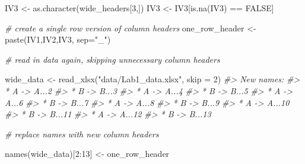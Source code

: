 \documentclass[
]{book}
\newenvironment{Shaded}{\begin{snugshade}}{\end{snugshade}}
\newcommand{\AttributeTok}[1]{\textcolor[rgb]{0.77,0.63,0.00}{#1}}
\newcommand{\CommentTok}[1]{\textcolor[rgb]{0.56,0.35,0.01}{\textit{#1}}}
\newcommand{\ConstantTok}[1]{\textcolor[rgb]{0.00,0.00,0.00}{#1}}
\newcommand{\DecValTok}[1]{\textcolor[rgb]{0.00,0.00,0.81}{#1}}
\newcommand{\FunctionTok}[1]{\textcolor[rgb]{0.00,0.00,0.00}{#1}}
\newcommand{\NormalTok}[1]{#1}
\newcommand{\OtherTok}[1]{\textcolor[rgb]{0.56,0.35,0.01}{#1}}
\newcommand{\SpecialCharTok}[1]{\textcolor[rgb]{0.00,0.00,0.00}{#1}}
\newcommand{\StringTok}[1]{\textcolor[rgb]{0.31,0.60,0.02}{#1}}
\theoremstyle{definition}
\theoremstyle{definition}
\theoremstyle{definition}
\theoremstyle{definition}
\theoremstyle{remark}
\begin{document}
\begin{Shaded}
\begin{Highlighting}[]
\NormalTok{IV3 }\OtherTok{\textless{}{-}} \FunctionTok{as.character}\NormalTok{(wide\_headers[}\DecValTok{3}\NormalTok{,])}
\NormalTok{IV3 }\OtherTok{\textless{}{-}}\NormalTok{ IV3[}\FunctionTok{is.na}\NormalTok{(IV3) }\SpecialCharTok{==} \ConstantTok{FALSE}\NormalTok{]}

\CommentTok{\# create a single row version of column headers}
\NormalTok{one\_row\_header }\OtherTok{\textless{}{-}} \FunctionTok{paste}\NormalTok{(IV1,IV2,IV3, }\AttributeTok{sep=}\StringTok{"\_"}\NormalTok{)}

\CommentTok{\# read in data again, skipping unnecessary column headers}

\NormalTok{wide\_data }\OtherTok{\textless{}{-}} \FunctionTok{read\_xlsx}\NormalTok{(}\StringTok{"data/Lab1\_data.xlsx"}\NormalTok{, }\AttributeTok{skip =} \DecValTok{2}\NormalTok{)}
\CommentTok{\#\textgreater{} New names:}
\CommentTok{\#\textgreater{} * \textasciigrave{}A\textasciigrave{} {-}\textgreater{} \textasciigrave{}A...2\textasciigrave{}}
\CommentTok{\#\textgreater{} * \textasciigrave{}B\textasciigrave{} {-}\textgreater{} \textasciigrave{}B...3\textasciigrave{}}
\CommentTok{\#\textgreater{} * \textasciigrave{}A\textasciigrave{} {-}\textgreater{} \textasciigrave{}A...4\textasciigrave{}}
\CommentTok{\#\textgreater{} * \textasciigrave{}B\textasciigrave{} {-}\textgreater{} \textasciigrave{}B...5\textasciigrave{}}
\CommentTok{\#\textgreater{} * \textasciigrave{}A\textasciigrave{} {-}\textgreater{} \textasciigrave{}A...6\textasciigrave{}}
\CommentTok{\#\textgreater{} * \textasciigrave{}B\textasciigrave{} {-}\textgreater{} \textasciigrave{}B...7\textasciigrave{}}
\CommentTok{\#\textgreater{} * \textasciigrave{}A\textasciigrave{} {-}\textgreater{} \textasciigrave{}A...8\textasciigrave{}}
\CommentTok{\#\textgreater{} * \textasciigrave{}B\textasciigrave{} {-}\textgreater{} \textasciigrave{}B...9\textasciigrave{}}
\CommentTok{\#\textgreater{} * \textasciigrave{}A\textasciigrave{} {-}\textgreater{} \textasciigrave{}A...10\textasciigrave{}}
\CommentTok{\#\textgreater{} * \textasciigrave{}B\textasciigrave{} {-}\textgreater{} \textasciigrave{}B...11\textasciigrave{}}
\CommentTok{\#\textgreater{} * \textasciigrave{}A\textasciigrave{} {-}\textgreater{} \textasciigrave{}A...12\textasciigrave{}}
\CommentTok{\#\textgreater{} * \textasciigrave{}B\textasciigrave{} {-}\textgreater{} \textasciigrave{}B...13\textasciigrave{}}

\CommentTok{\# replace names with new column headers }

\FunctionTok{names}\NormalTok{(wide\_data)[}\DecValTok{2}\SpecialCharTok{:}\DecValTok{13}\NormalTok{] }\OtherTok{\textless{}{-}}\NormalTok{ one\_row\_header}


\end{Highlighting}
\end{Shaded}
\end{document}
